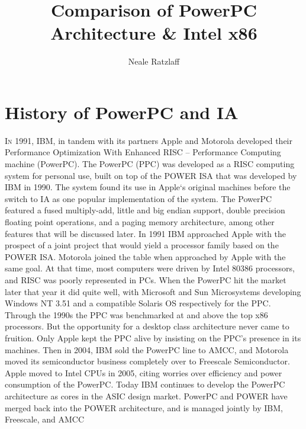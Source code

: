 \documentclass[10pt]{article}
\title{Comparison of PowerPC Architecture \& Intel x86}
\author{Neale Ratzlaff}
\begin{document}
\maketitle
\thispagestyle{fancy} %

\section{History of PowerPC and IA}

\textsc{In} 1991, IBM, in tandem with its partners Apple and Motorola developed their Performance Optimization With Enhanced RISC – Performance Computing machine (PowerPC). The PowerPC (PPC) was developed as a RISC computing system for personal use, built on top of the POWER ISA that was developed by IBM in 1990. The system found its use in Apple`s original machines before the switch to IA as one popular implementation of the system. The PowerPC featured a fused multiply-add, little and big endian support, double precision floating point operations, and a paging memory architecture, among other features that will be discussed later.  In 1991 IBM approached Apple with the prospect of a joint project that would yield a processor family based on the POWER ISA. Motorola joined the table when approached by Apple with the same goal. At that time, most computers were driven by Intel 80386 processors, and RISC was poorly represented in PCs. When the PowerPC hit the market later that year it did quite well, with Microsoft and Sun Microsystems developing Windows NT 3.51 and a compatible Solaris OS respectively for the PPC. Through the 1990s the PPC was benchmarked at and above the top x86 processors. But the opportunity for a desktop class architecture never came to fruition. Only Apple kept the PPC alive by insisting on the PPC’s presence in its machines.  Then in 2004, IBM sold the PowerPC line to AMCC, and Motorola moved its semiconductor business completely over to Freescale Semiconductor. Apple moved to Intel CPUs in 2005, citing worries over efficiency and power consumption of the PowerPC. Today IBM continues to develop the PowerPC architecture as cores in the ASIC design market. PowerPC and POWER have merged back into the POWER architecture, and is managed jointly by IBM, Freescale, and AMCC
\par
\end{document}
